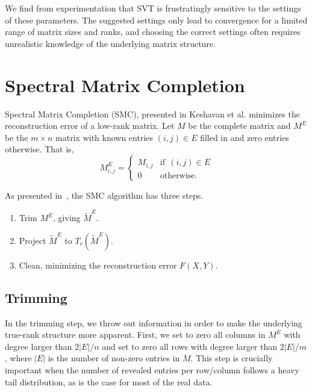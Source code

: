 \documentclass{article} %
\begin{document}
We find from experimentation that SVT is frustratingly sensitive to
the settings of these parameters. The suggested settings only lead to
convergence for a limited range of matrix sizes and ranks, and
choosing the correct settings often requires unrealistic knowledge of
the underlying matrix structure.

\section{Spectral Matrix Completion}

Spectral Matrix Completion (SMC), presented in Keshavan et al.
\cite{keshavan2010matrix} minimizes the reconstruction error of a
low-rank matrix. Let $M$ be the complete matrix and $M^E$ be the
$m \times n$ matrix with known entries $(i,j) \in E$ filled in and
zero entries otherwise. That is,
\begin{equation}
M^E_{i,j} = \begin{cases}
    M_{i,j} & \text{if} \ \  (i,j) \in E \\
    0      & \text{otherwise}.
   \end{cases}
\end{equation}

As presented in~\cite{keshavan2010matrix}, the SMC algorithm has three
steps.
\begin{enumerate}
\item Trim $M^E$, giving $\widetilde{M}^E$.
\item Project $\widetilde{M}^E$ to $T_r(\widetilde{M}^E)$.
\item Clean, minimizing the reconstruction error $F(X,Y)$.
\end{enumerate}

\subsection{Trimming}
In the trimming step, we throw out information in order to make the
underlying true-rank structure more apparent. First, we set to zero
all columns in $M^E$ with degree larger than $2|E|/n$ and set to zero
all rows with degree larger than $2|E|/m$, where $|E|$ is the number
of non-zero entries in $M$. This step is crucially important when the
number of revealed entries per row/column follows a heavy tail
distribution, as is the case for most of the real data.
\end{document}

